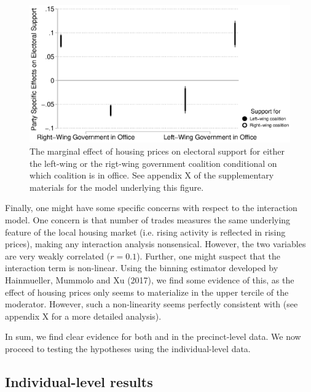 \documentclass[12pt,a4paper]{article}
\begin{document}
	\begin{figure}
		\includegraphics[width=1\textwidth]{../figures/partyspecific.eps}
		\caption{The marginal effect of housing prices on electoral support for either the left-wing or the rigt-wing government coalition conditional on which coalition is in office. See appendix X of the supplementary materials for the model underlying this figure.}
		\label {partyspecific}
	\end{figure}
	
	Finally, one might have some specific concerns with respect to the interaction model. One concern is that number of trades measures the same underlying feature of the local housing market (i.e. rising activity is reflected in rising prices), making any interaction analysis nonsensical. However, the two variables are very weakly correlated ($r=0.1$). Further, one might suspect that the interaction term is non-linear. Using the binning estimator developed  by Hainmueller, Mummolo and Xu (2017), we find some evidence of this, as the effect of housing prices only seems to materialize in the upper tercile of the moderator. However, such a non-linearity seems perfectly consistent with \htwo  (see appendix X for a more detailed analysis). 
	
	In sum, we find clear evidence for both \hone and \htwo in the precinct-level data. We now proceed to testing the hypotheses using the individual-level data.
	
	\subsection{Individual-level results}
	
\end{document}
